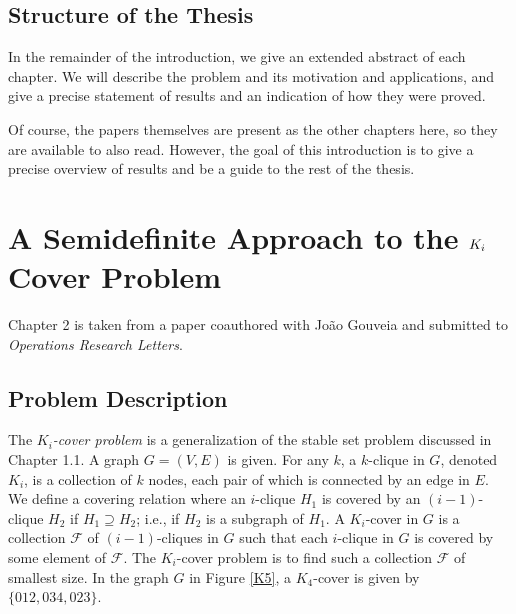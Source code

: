 \subsection{Structure of the Thesis}
In the remainder of the introduction, we give an extended abstract of each
chapter. We will describe the problem and its motivation and applications,
and give a precise statement of results and an indication of how they were 
proved.

Of course, the papers themselves are present as the other chapters here, so
they are available to also read. However, the goal of this introduction
is to give a precise overview of results and be a guide to the rest of the
thesis.

\section{A Semidefinite Approach to the $K_\MakeLowercase{i}$ Cover Problem}
Chapter 2 is taken from a paper coauthored with Jo\~ao Gouveia and submitted to 
\emph{Operations Research Letters}. 

\subsection{Problem Description}

The {\em $K_i$-cover problem} is a generalization of the stable set problem discussed
in Chapter 1.1. A graph $G = (V,E)$ is given. For any $k$, a $k$-clique in $G$,
denoted $K_i$,
is a collection of $k$ nodes, each pair of which is connected by an edge in $E$.
We define a covering relation where an $i$-clique $H_1$ is covered by an 
$(i-1)$-clique $H_2$ if $H_1 \supseteq H_2$; i.e., if $H_2$ is a subgraph of
$H_1$. A $K_i$-cover in $G$ is a
collection $\mathcal{F}$ of $(i-1)$-cliques in $G$ such that each $i$-clique in $G$
is covered by some element of $\mathcal{F}$. The $K_i$-cover problem is to find such a
collection $\mathcal{F}$ of smallest size.
In the graph $G$ in Figure \ref{K5}, a $K_4$-cover is given by $\{012,034,023\}$.

